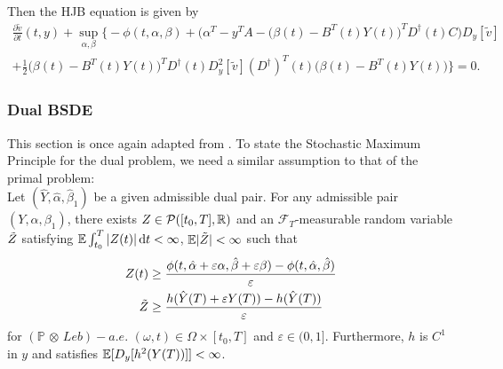 Then the HJB equation is given by
\begin{align*}
    \frac{\partial \tilde{v}}{\partial t} (t, y) + \sup_{\alpha, \beta} \bigg\{ - \phi(t, \alpha, \beta) + \big(\alpha^T - y^T A - \big(\beta(t) - B^T(t) Y(t)\big)^T D^\dagger(t) C\big)D_y[\tilde{v}]\\
    + \frac12 \big(\beta(t) - B^T(t) Y(t)\big)^T D^\dagger(t) D_y^2[\tilde{v}] (D^\dagger)^T(t) \big(\beta(t) - B^T(t) Y(t)\big)  \bigg\} = 0.
\end{align*}










\subsubsection{Dual BSDE}
This section is once again adapted from \cite{Duality_Method_for_Multidimensional_Nonsmooth_Constrained_Linear_Convex_Stochastic_Control}. To state the Stochastic Maximum Principle for the dual problem, we need a similar assumption to that of the primal problem:\\

Let $(\hat{Y}, \hat{\alpha}, \hat{\beta}_1)$ be a given admissible dual pair. For any admissible pair $(Y, \alpha, \beta_1)$, there exists $Z \in \mathcal{P}([t_0, T], \mathbb{R})$ and an $\mathcal{F}_T$-measurable random variable $\Tilde{Z}$ satisfying $\mathbb{E} \int_{t_0}^T |Z(t)| \mathop{}\!\mathrm{d} t < \infty$, $\mathbb{E} |\Tilde{Z}| < \infty$ such that
\begin{align*}
    Z(t) &\ge \frac{\phi(t, \hat{\alpha} + \varepsilon \alpha, \hat{\beta} + \varepsilon \beta) - \phi(t, \hat{\alpha}, \hat{\beta})}{\varepsilon}\\
    \Tilde{Z} &\ge \frac{h(\hat{Y}(T) + \varepsilon Y(T))  - h(\hat{Y}(T))}{\varepsilon}
\end{align*}
for $(\mathbb{P} \, \otimes \, Leb)-a.e.$ $(\omega, t) \in \Omega \times [t_0, T]$ and $\varepsilon \in (0, 1]$. Furthermore, $h$ is $C^1$ in $y$ and satisfies $\mathbb{E}[D_y[h^2(Y(T))]] < \infty$. \\

